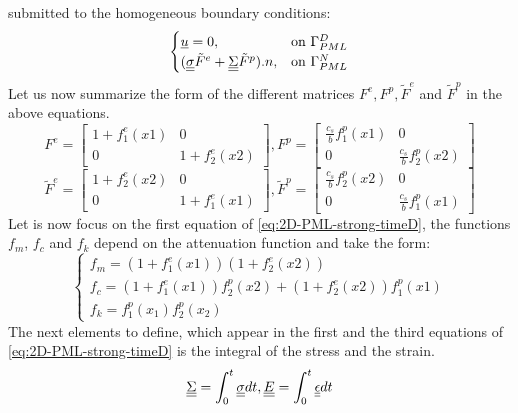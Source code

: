 submitted to the homogeneous boundary conditions:
\begin{equation}
\begin{cases}
\underline{u}=0,& \text{on } \Gamma_{PML}^D\\
(\underline{\underline{\sigma}}\tilde{F}^e + \underline{\underline{\Sigma}}\tilde{F}^p).n , & \text{on } \Gamma_{PML}^N 
\end{cases}
\label{eq:conditions-lim}
\end{equation}
Let us now summarize the form of the different matrices $F^e,F^p,\tilde{F}^e$ and $\tilde{F}^p$ in the above equations.
\begin{equation}
F^e = \begin{bmatrix}
1+f^e_1(x1)&0\\0&1+f^e_2(x2)
\end{bmatrix}, F^p = \begin{bmatrix}
\frac{c_s}{b}f^p_1(x1)&0\\0&\frac{c_s}{b}f^p_2(x2) 
\end{bmatrix} 
\end{equation}
\begin{equation}
\tilde{F}^e = \begin{bmatrix}
1+f^e_2(x2)&0\\0&1+f^e_1(x1)
\end{bmatrix}, \tilde{F}^p = \begin{bmatrix}
\frac{c_s}{b}f^p_2(x2)&0\\0&\frac{c_s}{b}f^p_1(x1) 
\end{bmatrix} 
\end{equation}
Let is now focus on the first equation of \ref{eq:2D-PML-strong-timeD}, the functions $f_m$, $f_c$ and $f_k$ depend on the attenuation function and take the form:
\begin{equation}
\begin{cases}
f_m = (1+f^e_1(x1))(1+f^e_2(x2))\\
f_c = (1+f^e_1(x1))f^p_2(x2) + (1+f^e_2(x2))f^p_1(x1)\\
f_k = f^p_1(x_1)f^p_2(x_2)
\end{cases}
\end{equation}
The next elements to define, which appear in the first and the third equations of \ref{eq:2D-PML-strong-timeD} is the integral of the stress and the strain.
\begin{equation}
\underline{\underline{\Sigma}} = \int^t_0 \underline{\underline{\sigma}} dt, \underline{\underline{E}} = \int^t_0 \underline{\underline{\epsilon}} dt
\end{equation} 
